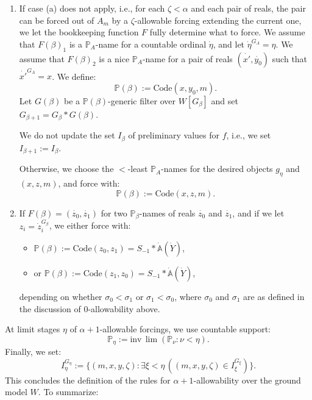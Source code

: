 \documentclass[a4paper,11pt]{article}
\newcommand{\forceP}{\mathbb{P}}
\begin{document}
\begin{enumerate}
\item[(b)] If case (a) does not apply, i.e., for each \( \zeta < \alpha \) and each pair of reals, the pair can be forced out of \( A_m \) by a \( \zeta \)-allowable forcing extending the current one, we let the bookkeeping function \( F \) fully determine what to force. We assume that \( F(\beta)_1 \) is a \( \forceP_A \)-name for a countable ordinal \( \dot{\eta} \), and let \( \dot{\eta}^{G_A} = \eta \). We assume that \( F(\beta)_2 \) is a nice \( \forceP_A \)-name for a pair of reals \( (\dot{x'}, \dot{y_0}) \) such that \( \dot{x'}^{G_A} = x \). We define:
  \[
  \forceP(\beta) := \text{Code}(x, y_0, m).
  \]
  Let \( G(\beta) \) be a \( \forceP(\beta) \)-generic filter over \( W[G_{\beta}] \) and set \( G_{\beta+1} = G_{\beta} \ast G(\beta) \).

  We do not update the set \( I_{\beta} \) of preliminary values for \( f \), i.e., we set \( I_{\beta+1} := I_{\beta} \).

  Otherwise, we choose the \( < \)-least \( \forceP_A \)-names for the desired objects \( g_{\eta} \) and \( (x, z, m) \), and force with:
  \[
  \forceP(\beta) := \text{Code}(x, z, m).
  \]

\item[(c)] If \( F(\beta) = (\dot{z_0}, \dot{z_1}) \) for two \( \forceP_{\beta} \)-names of reals \( \dot{z_0} \) and \( \dot{z_1} \), and if we let \( z_i = \dot{z}_i^{G_{\beta}} \), we either force with:

  \begin{itemize}
  \item[] \( \forceP(\beta) := \text{Code}(z_0, z_1) = S_{-1} \ast \dot{\mathbb{A}}(\dot{Y}) \),
  \item[] or \( \forceP(\beta) := \text{Code}(z_1, z_0) = S_{-1} \ast \dot{\mathbb{A}}(\dot{Y}) \),
  \end{itemize}
  depending on whether \( \sigma_0 < \sigma_1 \) or \( \sigma_1 < \sigma_0 \), where \( \sigma_0 \) and \( \sigma_1 \) are as defined in the discussion of 0-allowability above.
\end{enumerate}

At limit stages \( \eta \) of \( \alpha + 1 \)-allowable forcings, we use countable support:
\[
\forceP_{\eta} := \text{inv} \, \lim (\forceP_{\nu} : \nu < \eta).
\]
Finally, we set:
\[
I_{\eta}^{G_{\eta}} := \{ (m, x, y, \zeta) : \exists \xi < \eta \, ((m, x, y, \zeta) \in I_{\xi}^{G_{\xi}}) \}.
\]
This concludes the definition of the rules for \( \alpha + 1 \)-allowability over the ground model \( W \). To summarize:
\end{document}
